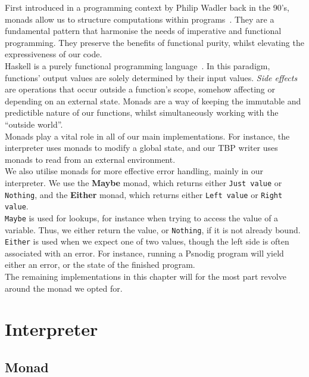 First introduced in a programming context by Philip Wadler back in the 90's, monads allow us to structure computations within programs~\cite{originOfMonads, leifharaldMaster}. They are a fundamental pattern that harmonise the needs of imperative and functional programming. They preserve the benefits of functional purity, whilst elevating the expressiveness of our code. \\

Haskell is a purely functional programming language~\cite{whatIsHaskell}. In this paradigm, functions' output values are solely determined by their input values. \textit{Side effects} are operations that occur outside a function's scope, somehow affecting or depending on an external state. Monads are a way of keeping the immutable and predictible nature of our functions, whilst simultaneously working with the ``outside world''. \\

Monads play a vital role in all of our main implementations. For instance, the interpreter uses monads to modify a global state, and our TBP writer uses monads to read from an external environment. \\

We also utilise monads for more effective error handling, mainly in our interpreter. We use the \textbf{Maybe} monad, which returns either \texttt{Just value} or \texttt{Nothing}, and the \textbf{Either} monad, which returns either \texttt{Left value} or \texttt{Right value}. \\

\texttt{Maybe} is used for lookups, for instance when trying to access the value of a variable. Thus, we either return the value, or \texttt{Nothing}, if it is not already bound. \texttt{Either} is used when we expect one of two values, though the left side is often associated with an error. For instance, running a Psnodig program will yield either an error, or the state of the finished program. \\

The remaining implementations in this chapter will for the most part revolve around the monad we opted for.

\section{Interpreter}

\subsection{Monad}

